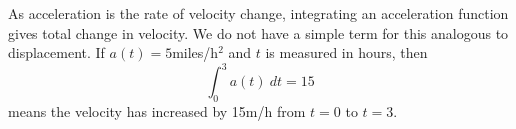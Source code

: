 
As acceleration is the rate of velocity change, integrating an acceleration function gives total change in velocity. We do not have a simple term for this analogous to displacement. If $a(t) = 5$miles/h$^2$ and $t$ is measured in hours, then 
\[\int_0^3 a(t)\ dt = 15\]
means the velocity has increased by 15m/h from $t=0$ to $t=3$.


